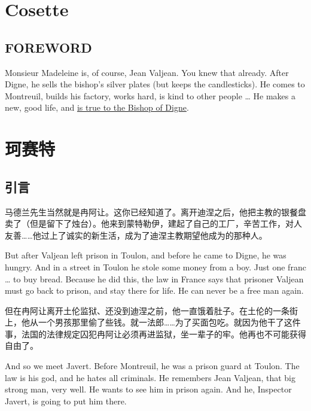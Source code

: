 \documentclass[fontset=ubuntu, zihao=5]{ctexart}
\begin{document}
\clearpage

\begin{paracol}{2}

  \section{Cosette}

  \subsection*{FOREWORD}


  Monsieur Madeleine is, of course, Jean Valjean. You knew that already. After
  Digne, he sells the bishop's silver plates (but keeps the candlesticks). He
  comes to Montreuil, builds his factory, works hard, is kind to other people
  \ldots{} He makes a new, good life, and \uline{is true to the Bishop of
    Digne}.

  \switchcolumn

  \section*{珂赛特}

  \subsection*{引言}

  马德兰先生当然就是冉阿让。这你已经知道了。离开迪涅之后，他把主教的银餐盘卖了（但是留下了烛台）。他来到蒙特勒伊，建起了自己的工厂，辛苦工作，对人友善……他过上了诚实的新生活，成为了迪涅主教期望他成为的那种人。

  \switchcolumn*

  But after Valjean left prison in Toulon, and before he came to Digne, he was hungry. And in a street in Toulon he stole some money from a boy. Just one franc \ldots{} to buy bread. Because he did this, the law in France says that prisoner Valjean must go back to prison, and stay there for life. He can never be a free man again.

  \switchcolumn

  但在冉阿让离开土伦监狱、还没到迪涅之前，他一直饿着肚子。在土伦的一条街上，他从一个男孩那里偷了些钱。就一法郎……为了买面包吃。就因为他干了这件事，法国的法律规定囚犯冉阿让必须再进监狱，坐一辈子的牢。他再也不可能获得自由了。

  \switchcolumn*

  And so we meet Javert. Before Montreuil, he was a prison guard at Toulon. The law is his god, and he hates all criminals. He remembers Jean Valjean, that big strong man, very well. He wants to see him in prison again. And he, Inspector Javert, is going to put him there.


\end{paracol}
\end{document}
